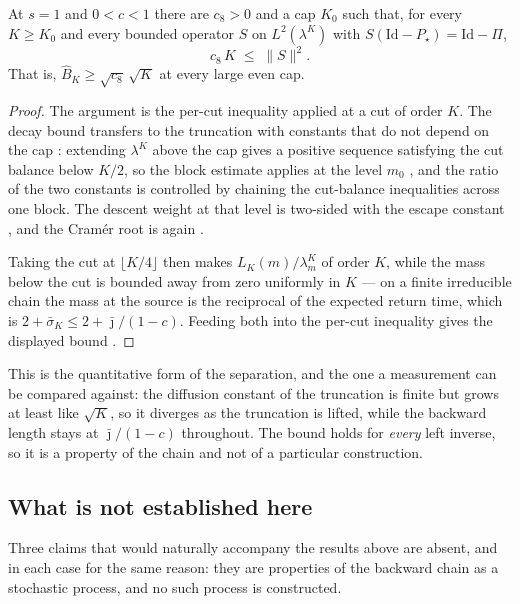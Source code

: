 \begin{theorem}
  \label{thm:main_truncation_sqrtK}
  \leanok
At $s=1$ and $0<c<1$ there are $c_8>0$ and a cap $K_0$ such that, for every $K\geq K_0$ and
every bounded operator $S$ on $L^2(\lambda^K)$ with $S(\mathrm{Id}-P_\star)=\mathrm{Id}-\Pi$,
\[ c_8\,K \;\leq\; \|S\|^2 . \]
That is, $\widehat B_K\geq\sqrt{c_8}\,\sqrt K$ at every large even cap.
\end{theorem}

\begin{proof}
  \leanok
The argument is the per-cut inequality applied at a cut of order $K$. The decay bound transfers
to the truncation with constants that do not depend on the cap
: extending $\lambda^K$ above the cap gives a positive
sequence satisfying the cut balance below $K/2$, so the block estimate applies at the level
$m_0$ , and the ratio of the two constants is controlled by
chaining the cut-balance inequalities across one block. The descent weight at that level is
two-sided  with the escape constant
, and the Cram\'er root is again
.

Taking the cut at $\lfloor K/4\rfloor$ then makes $L_K(m)/\lambda^K_m$ of order $K$, while the
mass below the cut is bounded away from zero uniformly in $K$ --- on a finite irreducible chain
the mass at the source is the reciprocal of the expected return time, which is
$2+\bar\sigma_K\leq2+\bar\jmath/(1-c)$. Feeding both into the per-cut inequality gives the
displayed bound .
\end{proof}

\noindent This is the quantitative form of the separation, and the one a measurement can be compared
against: the diffusion constant of the truncation is finite but grows at least like $\sqrt K$,
so it diverges as the truncation is lifted, while the backward length stays at
$\bar\jmath/(1-c)$ throughout. The bound holds for \emph{every} left inverse, so it is a
property of the chain and not of a particular construction.


\subsection{What is not established here}\label{sec:doubling_differences}

Three claims that would naturally accompany the results above are absent, and in each case for
the same reason: they are properties of the backward chain as a stochastic process, and no such
process is constructed.

